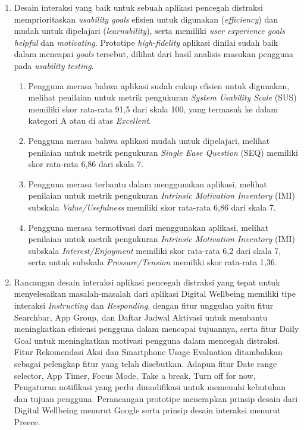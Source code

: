 \begin{enumerate}
  \item Desain interaksi yang baik untuk sebuah aplikasi pencegah distraksi memprioritaskan \textit{usability goals} efisien untuk digunakan (\textit{efficiency}) dan mudah untuk dipelajari (\textit{learnability}), serta memiliki \textit{user experience goals} \textit{helpful} dan \textit{motivating}. Prototipe \textit{high-fidelity} aplikasi dinilai sudah baik dalam mencapai \textit{goals} tersebut, dilihat dari hasil analisis masukan pengguna pada \textit{usability testing}.
    \begin{enumerate}[label=\alph*.]
      \item Pengguna merasa bahwa aplikasi sudah cukup efisien untuk digunakan, melihat penilaian untuk metrik pengukuran \textit{System Usability Scale} (SUS) memiliki skor rata-rata 91,5 dari skala 100, yang termasuk ke dalam kategori A atau di atas \textit{Excellent}. 
      
      \item Pengguna merasa bahwa aplikasi mudah untuk dipelajari, melihat penilaian untuk metrik pengukuran \textit{Single Ease Question} (SEQ) memiliki skor rata-rata 6,86 dari skala 7.
      
      \item Pengguna merasa terbantu dalam menggunakan aplikasi, melihat penilaian untuk metrik pengukuran \textit{Intrinsic Motivation Inventory} (IMI) subskala \textit{Value/Usefulness} memiliki skor rata-rata 6,86 dari skala 7.
      
      \item Pengguna merasa termotivasi dari menggunakan aplikasi, melihat penilaian untuk metrik pengukuran \textit{Intrinsic Motivation Inventory} (IMI) subskala \textit{Interest/Enjoyment} memiliki skor rata-rata 6,2 dari skala 7, serta untuk subskala \textit{Pressure/Tension} memiliki skor rata-rata 1,36.
        
    \end{enumerate}
    
  \item Rancangan desain interaksi aplikasi pencegah distraksi yang tepat untuk menyelesaikan masalah-masalah dari aplikasi Digital Wellbeing memiliki tipe interaksi \textit{Instructing} dan \textit{Responding}, dengan fitur unggulan yaitu fitur Searchbar, App Group, dan Daftar Jadwal Aktivasi untuk membantu meningkatkan efisiensi pengguna dalam mencapai tujuannya, serta fitur Daily Goal untuk meningkatkan motivasi pengguna dalam mencegah distraksi. Fitur Rekomendasi Aksi dan Smartphone Usage Evaluation ditambahkan sebagai pelengkap fitur yang telah disebutkan. Adapun fitur Date range selector, App Timer, Focus Mode, Take a break, Turn off for now, Pengaturan notifikasi yang perlu dimodifikasi untuk memenuhi kebutuhan dan tujuan pengguna. Perancangan prototipe menerapkan prinsip desain dari Digital Wellbeing menurut Google serta prinsip desain interaksi menurut Preece.  
   
\end{enumerate}

